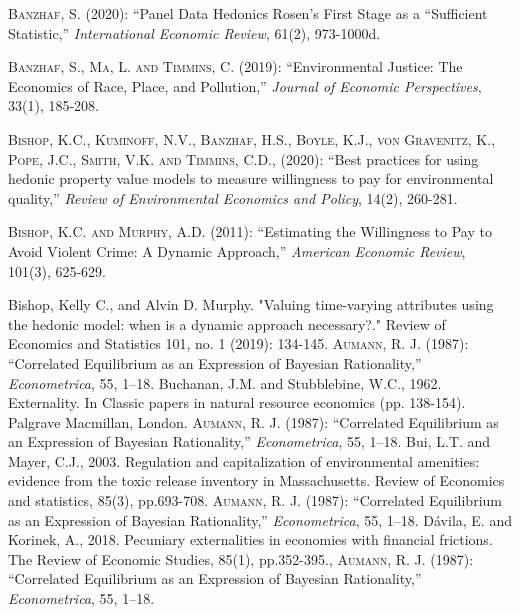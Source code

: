 \documentclass[ecta,nameyear,draft]{econsocart}
\theoremstyle{plain}
\theoremstyle{remark}
\begin{document}
\begin{thebibliography}{}
%


\textsc{Banzhaf, S.} (2020):
``Panel Data Hedonics Rosen’s First Stage as a “Sufficient
Statistic,''
\textit{International Economic Review}, 61(2), 973-1000d.
\endbibitem


\textsc{Banzhaf, S., Ma, L. and Timmins, C.} (2019):
``Environmental Justice: The Economics of Race, Place, and Pollution,''
\textit{Journal of Economic Perspectives}, 33(1), 185-208.
\endbibitem

\textsc{Bishop, K.C., Kuminoff, N.V., Banzhaf, H.S., Boyle, K.J., von Gravenitz, K., Pope, J.C., Smith, V.K. and Timmins, C.D., } (2020):
``Best practices for using hedonic property value models to measure willingness to pay for environmental quality,''
\textit{Review of Environmental Economics and Policy}, 14(2), 260-281.
\endbibitem

\textsc{Bishop, K.C. and Murphy, A.D.} (2011):
``Estimating the Willingness to Pay to Avoid Violent Crime: A Dynamic Approach,''
\textit{American Economic Review}, 101(3), 625-629.
\endbibitem

Bishop, Kelly C., and Alvin D. Murphy. "Valuing time-varying attributes using the hedonic model: when is a dynamic approach necessary?." Review of Economics and Statistics 101, no. 1 (2019): 134-145. 
\textsc{Aumann, R. J.} (1987):
``Correlated Equilibrium as an Expression of Bayesian Rationality,''
\textit{Econometrica}, 55, 1--18.
\endbibitem
Buchanan, J.M. and Stubblebine, W.C., 1962. Externality. In Classic papers in natural resource economics (pp. 138-154). Palgrave Macmillan, London. 
\textsc{Aumann, R. J.} (1987):
``Correlated Equilibrium as an Expression of Bayesian Rationality,''
\textit{Econometrica}, 55, 1--18.
\endbibitem
Bui, L.T. and Mayer, C.J., 2003. Regulation and capitalization of environmental amenities: evidence from the toxic release inventory in Massachusetts. Review of Economics and statistics, 85(3), pp.693-708. 
\textsc{Aumann, R. J.} (1987):
``Correlated Equilibrium as an Expression of Bayesian Rationality,''
\textit{Econometrica}, 55, 1--18.
\endbibitem
Dávila, E. and Korinek, A., 2018. Pecuniary externalities in economies with financial frictions. The Review of Economic Studies, 85(1), pp.352-395.,  
\textsc{Aumann, R. J.} (1987):
``Correlated Equilibrium as an Expression of Bayesian Rationality,''
\textit{Econometrica}, 55, 1--18.
\endbibitem


\end{thebibliography}
\end{document}
